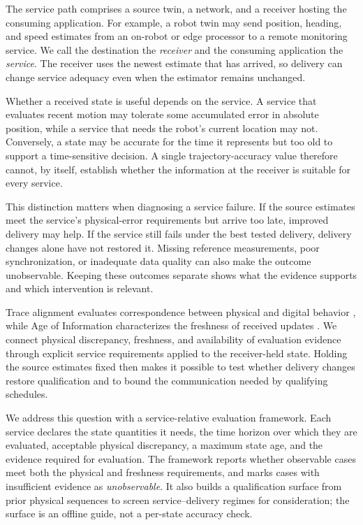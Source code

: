 \documentclass[journal]{IEEEtran}
\newcommand{\secondrev}[1]{{#1}}
\begin{document}
\secondrev{The service path comprises a source twin, a network, and a
receiver hosting the consuming application. For example, a robot twin
may send position, heading, and speed estimates from an on-robot or edge
processor to a remote monitoring service. We call the destination the
\emph{receiver} and the consuming application the \emph{service}. The
receiver uses the newest estimate that has arrived, so delivery can
change service adequacy even when the estimator remains unchanged.}

Whether a received state is useful depends on the service. A service that evaluates recent motion may tolerate some accumulated error in absolute position, while a service that needs the robot's current location may not. Conversely, a state may be accurate for the time it represents but too old to support a time-sensitive decision. A single trajectory-accuracy value therefore cannot, by itself, establish whether the information at the receiver is suitable for every service.

This distinction matters when diagnosing a service failure. If the source estimates meet the service's physical-error requirements but arrive too late, improved delivery may help. If the service still fails under the best tested delivery, delivery changes alone have not restored it. Missing reference measurements, poor synchronization, or inadequate data quality can also make the outcome unobservable. Keeping these outcomes separate shows what the evidence supports and which intervention is relevant.

\secondrev{Trace alignment evaluates correspondence between physical and
digital behavior \cite{munoz2024trace}, while Age of Information
characterizes the freshness of received updates \cite{yates2021aoi}.
We connect physical discrepancy, freshness, and availability of evaluation evidence
through explicit service requirements applied to the receiver-held state.
Holding the source estimates fixed then makes it possible to test whether
delivery changes restore qualification and to bound the communication
needed by qualifying schedules.}

We address this question with a service-relative evaluation framework. Each service declares the state quantities it needs, the time horizon over which they are evaluated, acceptable physical discrepancy, a maximum state age, and the evidence required for evaluation. The framework reports whether observable cases meet both the physical and freshness requirements, and marks cases with insufficient evidence as \emph{unobservable}. It also builds a qualification surface from prior physical sequences to screen service--delivery regimes for consideration; the surface is an offline guide, not a per-state accuracy check.
\end{document}

